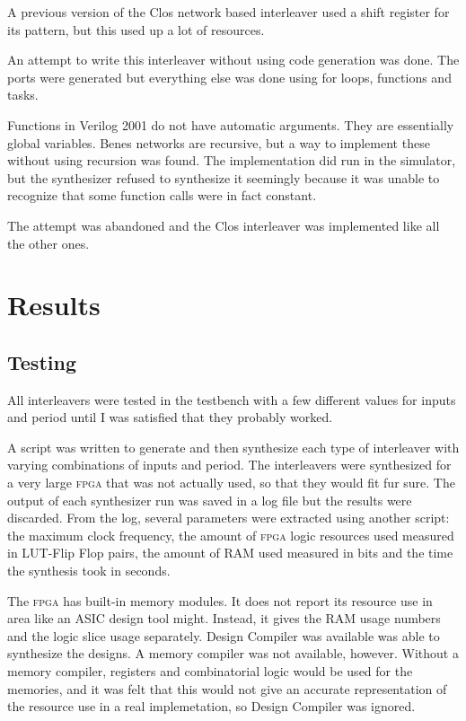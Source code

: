 \documentclass[
	utf8,
	largesmallcaps,
	intlimits,
	widermath,
	sharecounter,
	nobreak,
	definition=marks,
	numbers,
	noparts
]{rtthesis}
\let\textabbr\textsc
\newcommand{\abbrFPGA}{\texorpdfstring{\textabbr{fpga}}{FPGA}\xspace}
\begin{document}
A previous version of the Clos network based interleaver used a shift register
for its pattern, but this used up a lot of resources.

An attempt to write this interleaver without using code generation was done.
The ports were generated but everything else was done using for loops,
functions and tasks.

Functions in Verilog 2001 do not have automatic arguments. They are essentially
global variables. Benes networks are recursive, but a way to implement these
without using recursion was found. The implementation did run in the simulator,
but the synthesizer refused to synthesize it seemingly because it was unable to
recognize that some function calls were in fact constant.

The attempt was abandoned and the Clos interleaver was implemented like all the
other ones.

\chapter{Results}

\section{Testing}

All interleavers were tested in the testbench with a few different values for
inputs and period until I was satisfied that they probably worked.

A script was written to generate and then synthesize each type of interleaver
with varying combinations of inputs and period. The interleavers were
synthesized for a very large \abbrFPGA that was not actually used, so that they
would fit fur sure. The output of each synthesizer run was saved in a log file
but the results were discarded. From the log, several parameters were extracted
using another script: the maximum clock frequency, the amount of \abbrFPGA
logic resources used measured in LUT-Flip Flop pairs, the amount of RAM used
measured in bits and the time the synthesis took in seconds.

The \abbrFPGA has built-in memory modules. It does not report its resource use
in area like an ASIC design tool might. Instead, it gives the RAM usage numbers
and the logic slice usage separately. Design Compiler was available was able to
synthesize the designs. A memory compiler was not available, however. Without a
memory compiler, registers and combinatorial logic would be used for the
memories, and it was felt that this would not give an accurate representation
of the resource use in a real implemetation, so Design Compiler was ignored.
\end{document}
